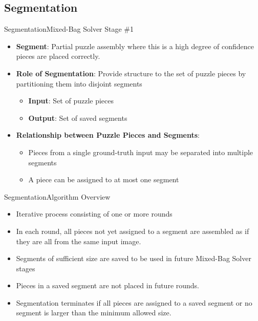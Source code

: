 \documentclass[handout,10pt]{beamer}  %
\begin{document}
\subsection{Segmentation}
\begin{frame}{Segmentation}{Mixed-Bag Solver Stage \#1}
  \begin{itemize}
    \item \textbf{Segment}: Partial puzzle assembly where this is a high degree of confidence pieces are placed correctly.
    \vfill
    \item \textbf{Role of Segmentation}: Provide structure to the set of puzzle pieces by partitioning them into disjoint segments
    \begin{itemize}
      \vspace{0.4em}
      	\item \textbf{Input}: Set of puzzle pieces
  		  \vspace{0.6em}
      \item \textbf{Output}: Set of saved segments
    \end{itemize}
	  \vfill
	  \item \textbf{Relationship between Puzzle Pieces and Segments}:
	  \vspace{0.4em}
	  \begin{itemize}
      \item Pieces from a single ground-truth input may be separated into multiple segments
  	  \vspace{0.6em}   
      \item A piece can be assigned to at most one segment   
    \end{itemize}
  \end{itemize}
\end{frame}



\begin{frame}{Segmentation}{Algorithm Overview}
  \begin{itemize}
    \item Iterative process consisting of one or more rounds  
    \vfill
    \item In each round, all pieces not yet assigned to a segment are assembled as if they are all from the same input image.
    \vfill
    \item Segments of sufficient size are saved to be used in future Mixed-Bag Solver stages
    \vfill
    \item Pieces in a saved segment are not placed in future rounds.
    \vfill
    \item Segmentation terminates if all pieces are assigned to a saved segment or no segment is larger than the minimum allowed size.
    \vfill
  \end{itemize}
\end{frame}
\end{document}

